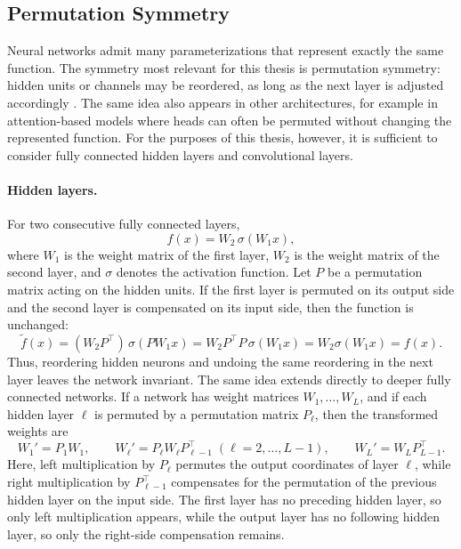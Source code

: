 \documentclass[11pt,a4paper]{report}
\begin{document}
\subsection{Permutation Symmetry}
\label{sec:permsym}

Neural networks admit many parameterizations that represent exactly the same function. The symmetry most relevant for this thesis is permutation symmetry: hidden units or channels may be reordered, as long as the next layer is adjusted accordingly \citet{hechtnielsen1990algebraic}. The same idea also appears in other architectures, for example in attention-based models where heads can often be permuted without changing the represented function. For the purposes of this thesis, however, it is sufficient to consider fully connected hidden layers and convolutional layers.

\paragraph{Hidden layers.}
For two consecutive fully connected layers,
\[
f(x) = W_2 \,\sigma(W_1 x),
\]
where \(W_1\) is the weight matrix of the first layer, \(W_2\) is the weight matrix of the second layer, and \(\sigma\) denotes the activation function. Let \(P\) be a permutation matrix acting on the hidden units. If the first layer is permuted on its output side and the second layer is compensated on its input side, then the function is unchanged:
\[
\widetilde{f}(x)
=
(W_2 P^\top)\,\sigma(P W_1 x)
=
W_2 P^\top P \,\sigma(W_1 x)
=
W_2 \sigma(W_1 x)
=
f(x).
\]
Thus, reordering hidden neurons and undoing the same reordering in the next layer leaves the network invariant. The same idea extends directly to deeper fully connected networks. If a network has weight matrices \(W_1,\dots,W_L\), and if each hidden layer \(\ell\) is permuted by a permutation matrix \(P_\ell\), then the transformed weights are
\[
W_1' = P_1 W_1,\qquad
W_\ell' = P_\ell W_\ell P_{\ell-1}^{\top}\;(\ell=2,\dots,L-1),\qquad
W_L' = W_L P_{L-1}^{\top}.
\]
Here, left multiplication by \(P_\ell\) permutes the output coordinates of layer \(\ell\), while right multiplication by \(P_{\ell-1}^{\top}\) compensates for the permutation of the previous hidden layer on the input side. The first layer has no preceding hidden layer, so only left multiplication appears, while the output layer has no following hidden layer, so only the right-side compensation remains.
\end{document}
